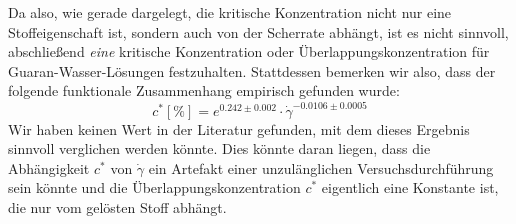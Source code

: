 \documentclass[11pt,a4paper,oneside]{scrartcl}
\begin{document}
Da also, wie gerade dargelegt, die kritische Konzentration nicht nur eine Stoffeigenschaft ist, sondern auch von der Scherrate abhängt, ist es nicht sinnvoll, abschließend \emph{eine} kritische Konzentration oder Überlappungskonzentration für Guaran-Wasser-Lösungen festzuhalten. Stattdessen bemerken wir also, dass der folgende funktionale Zusammenhang empirisch gefunden wurde:
\begin{equation}
c^*[\%]=e^{0.242\pm0.002}\cdot\dot\gamma^{-0.0106\pm0.0005}
\end{equation}
Wir haben keinen Wert in der Literatur gefunden, mit dem dieses Ergebnis sinnvoll verglichen werden könnte. Dies könnte daran liegen, dass 
die Abhängigkeit $c^*$ von $\dot\gamma$ ein Artefakt einer unzulänglichen Versuchsdurchführung sein könnte und die Überlappungskonzentration $c^*$ eigentlich eine Konstante ist, die nur vom gelösten Stoff abhängt.



\end{document}
